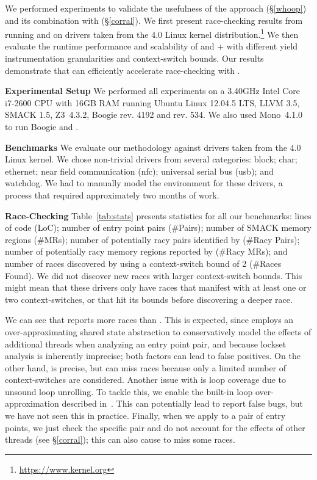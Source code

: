 We performed experiments to validate the usefulness of the \whoop approach (\S\ref{whoop}) and its combination with \corral (\S\ref{corral}). We first present race-checking results from running \whoop and \corral on \sizeOfBenchmarks drivers taken from the 4.0 Linux kernel distribution.\footnote{\url{https://www.kernel.org}} We then evaluate the runtime performance and scalability of \corral and \whoop + \corral with different yield instrumentation granularities and context-switch bounds.
Our results demonstrate that \whoop can efficiently accelerate race-checking with \corral.

\medskip\noindent\textbf{Experimental Setup }
%
We performed all experiments on a 3.40GHz Intel Core i7-2600 CPU with 16GB RAM running Ubuntu Linux 12.04.5 LTS, LLVM 3.5, SMACK 1.5, Z3~4.3.2, Boogie rev. 4192 and \corral rev. 534. We also used Mono~4.1.0 to run Boogie and \corral.

\medskip\noindent\textbf{Benchmarks }
%
We evaluate our methodology against \sizeOfBenchmarks drivers taken from the 4.0 Linux kernel. We chose non-trivial drivers from several categories: block; char; ethernet; near field communication (nfc); universal serial bus (usb); and watchdog. We had to manually model the environment for these drivers, a process that required approximately two months of work.

\medskip\noindent\textbf{Race-Checking }
%
Table~\ref{tab:stats} presents statistics for all our benchmarks: lines of code (LoC); number of entry point pairs (\#Pairs); number of SMACK memory regions (\#MRs); number of potentially racy pairs identified by \whoop (\#Racy Pairs); number of potentially racy memory regions reported by \whoop (\#Racy MRs); and number of races discovered by \corral using a context-switch bound of 2 (\#Races Found). We did not discover new races with larger context-switch bounds. This might mean that these drivers only have races that manifest with at least one or two context-switches, or that \corral hit its bounds before discovering a deeper race.

We can see that \whoop reports more races than \corral. This is expected, since \whoop employs an over-approximating shared state abstraction to conservatively model the effects of additional threads when analyzing an entry point pair, and because lockset analysis is inherently imprecise; both factors can lead to false positives.  On the other hand, \corral is precise, but can miss races because only a limited number of context-switches are considered.  Another issue with \corral is loop coverage due to unsound loop unrolling. To tackle this, we enable the built-in loop over-approximation described in~\cite{lal2014powering}. This can potentially lead \corral to report false bugs, but we have not seen this in practice. Finally, when we apply \corral to a pair of entry points, we just check the specific pair and do not account for the effects of other threads (see \S\ref{corral}); this can also cause \corral to miss some races.

